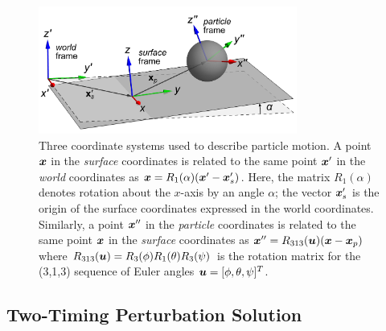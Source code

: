 \begin{figure}
    \centering
    \includegraphics[width=8.5cm]{figures/5Coordinates.png}
    \caption{Three coordinate systems used to describe particle motion.\autocite{diebel2006representing}  A point $\boldsymbol{x}$ in the \emph{surface} coordinates is related to the same point $\boldsymbol{x}'$ in the \emph{world} coordinates as $\boldsymbol{x}=R_1(\alpha) (\boldsymbol{x}'-\boldsymbol{x}'_s)$. Here, the matrix $R_1(\alpha)$ denotes rotation about the $x$-axis by an angle $\alpha$; the vector $\boldsymbol{x}'_s$ is the origin of the surface coordinates expressed in the world coordinates. Similarly, a point $\boldsymbol{x}''$ in the \emph{particle} coordinates is related to the same point $\boldsymbol{x}$ in the \emph{surface} coordinates as $\boldsymbol{x}''=R_{313}(\boldsymbol{u})(\boldsymbol{x}-\boldsymbol{x}_p)$ where $R_{313}(\boldsymbol{u})=R_3(\phi)R_1(\theta)R_3(\psi)$ is the rotation matrix for the (3,1,3) sequence of Euler angles $\boldsymbol{u}=[\phi,\theta,\psi]^T$. }
    \label{fig:Coordinates}
\end{figure}

\subsection{Two-Timing Perturbation Solution}

